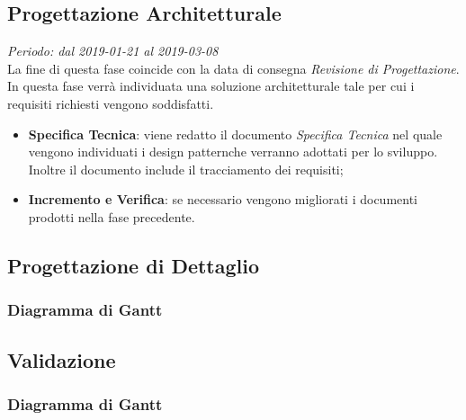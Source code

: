 \subsection{Progettazione Architetturale}
\textit{Periodo: dal 2019-01-21 al 2019-03-08} \\
La fine di questa fase coincide con la data di consegna \textit{Revisione di 
Progettazione}. In questa fase verrà individuata una soluzione architetturale 
tale per cui i requisiti richiesti vengono soddisfatti.
\begin{itemize}
	\item \textbf{Specifica Tecnica}: viene redatto il documento 
	\textit{Specifica Tecnica} nel quale vengono individuati i design 
	pattern\glosp che verranno adottati per lo sviluppo. Inoltre il documento 
	include il tracciamento dei requisiti;
	\item \textbf{Incremento e Verifica}: se necessario vengono migliorati i 
	documenti prodotti nella fase precedente.
\end{itemize}
\subsection{Progettazione di Dettaglio}
\subsubsection{Diagramma di Gantt}
\subsection{Validazione}
\subsubsection{Diagramma di Gantt}